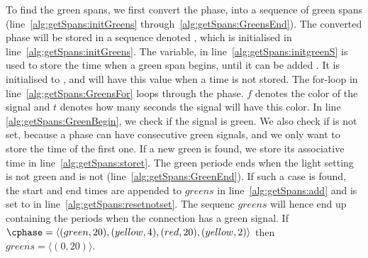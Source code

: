 To find the green spans, we first convert the phase, \phase into a sequence of green spans (line~\ref{alg:getSpans:initGreens} through~\ref{alg:getSpans:GreensEnd}).
The converted phase will be stored in a sequence denoted \greens, which is initialised in line~\ref{alg:getSpans:initGreens}.
The variable, \greenStart in line~\ref{alg:getSpans:initgreenS} is used to store the time when a green span begins, until it can be added \greens. 
It is initialised to \notset, and will have this value when a time is not stored.
The for-loop in line~\ref{alg:getSpans:GreensFor} loops through the phase.
$f$ denotes the color of the signal and $t$ denotes how many seconds the signal will have this color.
In line \ref{alg:getSpans:GreenBegin}, we check if the signal is green. 
We also check if \greenStart is not set, because a phase can have consecutive green signals, and we only want to store the time of the first one.
If a new green is found, we store its associative time in line~\ref{alg:getSpans:storet}.
The green periode ends when the light setting is not green and \greenStart is not \notset (line~\ref{alg:getSpans:GreenEnd}).
If such a case is found, the start and end times are appended to $greens$ in line~\ref{alg:getSpans:add} and \greenStart is set to \notset in line~\ref{alg:getSpans:resetnotset}.
The sequenc $greens$ will hence end up containing the periods when the connection has a green signal.
If $\cphase=\langle (green, 20), (yellow, 4), (red, 20), (yellow, 2)\rangle$ then $greens=\langle (0,20)\rangle$.

